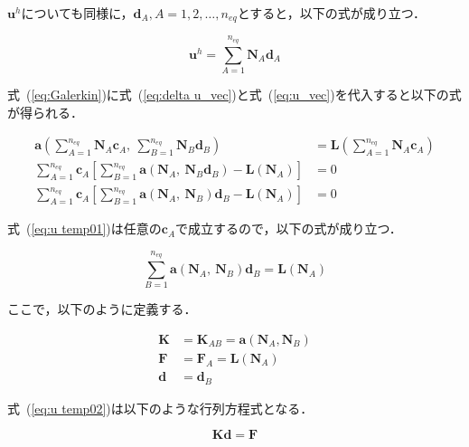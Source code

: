 \noindent
$\boldsymbol{u}^h$についても同様に，$\boldsymbol{d}_A,A=1,2,\dots,n_{eq}$とすると，以下の式が成り立つ．

\begin{equation}
  \label{eq:u_vec}
  \boldsymbol{u}^h=\sum^{n_{eq}}_{A=1}\boldsymbol{N}_A \boldsymbol{d}_A
\end{equation}

\newpage

\noindent
式~(\ref{eq:Galerkin})に式~(\ref{eq:delta u_vec})と式~(\ref{eq:u_vec})を代入すると以下の式が得られる．

\begin{align}
  \boldsymbol{a} \left(
    \sum^{n_{eq}}_{A=1}\boldsymbol{N}_A\boldsymbol{c}_A,\ \sum^{n_{eq}}_{B=1}\boldsymbol{N}_B\boldsymbol{d}_B
  \right) &=
  \boldsymbol{L} \left(
    \sum^{n_{eq}}_{A=1}\boldsymbol{N}_A\boldsymbol{c}_A
  \right) \nonumber \\
  \sum^{n_{eq}}_{A=1}\boldsymbol{c}_A \left[
    \sum^{n_{eq}}_{B=1} \boldsymbol{a} (\boldsymbol{N}_A,\ \boldsymbol{N}_B\boldsymbol{d}_B) - \boldsymbol{L} (\boldsymbol{N}_A)
  \right] &= 0 \nonumber \\
  \label{eq:u temp01}
  \sum^{n_{eq}}_{A=1}\boldsymbol{c}_A \left[
    \sum^{n_{eq}}_{B=1} \boldsymbol{a} (\boldsymbol{N}_A,\ \boldsymbol{N}_B)\boldsymbol{d}_B - \boldsymbol{L} (\boldsymbol{N}_A)
  \right] &= 0
\end{align}

\noindent
式~(\ref{eq:u temp01})は任意の$\boldsymbol{c}_A$で成立するので，以下の式が成り立つ．

\begin{equation}
  \label{eq:u temp02}
  \sum^{n_{eq}}_{B=1} \boldsymbol{a} (\boldsymbol{N}_A,\ \boldsymbol{N}_B)\boldsymbol{d}_B = \boldsymbol{L} (\boldsymbol{N}_A)
\end{equation}

\noindent
ここで，以下のように定義する．

\begin{align}
  \boldsymbol{K} &= \boldsymbol{K}_{AB} = \boldsymbol{a} (\boldsymbol{N}_A, \boldsymbol{N}_B)\\
  \boldsymbol{F} &= \boldsymbol{F}_{A} = \boldsymbol{L} (\boldsymbol{N}_A)\\
  \boldsymbol{d} &= \boldsymbol{d}_B
\end{align}

\noindent
式~(\ref{eq:u temp02})は以下のような行列方程式となる．

\begin{equation}
  \label{eq:u temp03}
  \boldsymbol{K}\boldsymbol{d} = \boldsymbol{F}
\end{equation}

